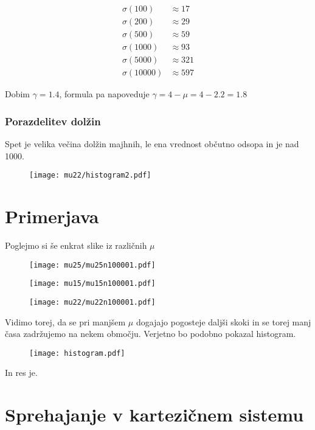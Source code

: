 \documentclass{article}
\begin{document}
\begin{align*}
\sigma(100) &\approx 17 \\
\sigma(200) &\approx 29 \\
\sigma(500) &\approx 59 \\
\sigma(1000) &\approx 93 \\
\sigma(5000) &\approx 321 \\
\sigma(10000) &\approx 597
\end{align*}

Dobim $\gamma = 1.4$, formula pa napoveduje $\gamma = 4-\mu = 4-2.2=1.8$

\subsubsection{Porazdelitev dolžin}

Spet je velika večina dolžin majhnih, le ena vrednost občutno odsopa in je nad 1000.

\begin{figure}[H]
\texttt{[image: mu22/histogram2.pdf]}
\end{figure}


\section{Primerjava}

Poglejmo si še enkrat  slike iz različnih $\mu$
\begin{figure}[H]
\texttt{[image: mu25/mu25n100001.pdf]}
\end{figure}
\begin{figure}[H]
\texttt{[image: mu15/mu15n100001.pdf]}
\end{figure}
\begin{figure}[H]
\texttt{[image: mu22/mu22n100001.pdf]}
\end{figure}

Vidimo torej, da se pri manjšem $\mu$ dogajajo pogosteje daljši skoki in se torej manj časa zadržujemo na nekem območju. Verjetno bo podobno pokazal histogram. 

\begin{figure}[H]
\texttt{[image: histogram.pdf]}
\end{figure}

In res je.

\section{Sprehajanje v kartezičnem sistemu}
\end{document}
